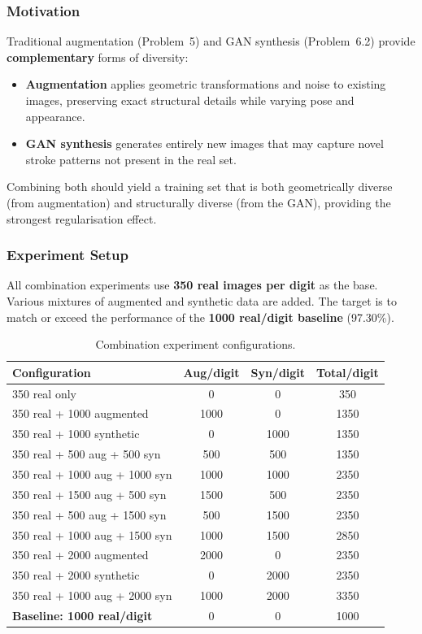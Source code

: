 \documentclass[12pt, a4paper]{article}
\renewcommand{\arraystretch}{1.12}
\begin{document}
\subsubsection{Motivation}

Traditional augmentation (Problem~5) and GAN synthesis (Problem~6.2) provide
\textbf{complementary} forms of diversity:
\begin{itemize}
    \item \textbf{Augmentation} applies geometric transformations and noise to existing
          images, preserving exact structural details while varying pose and appearance.
    \item \textbf{GAN synthesis} generates entirely new images that may capture novel
          stroke patterns not present in the real set.
\end{itemize}

Combining both should yield a training set that is both geometrically diverse (from
augmentation) and structurally diverse (from the GAN), providing the strongest
regularisation effect.

\subsubsection{Experiment Setup}

All combination experiments use \textbf{350 real images per digit} as the base. Various
mixtures of augmented and synthetic data are added. The target is to match or exceed
the performance of the \textbf{1000 real/digit baseline} (97.30\%).

\begin{table}[H]
\centering
\renewcommand{\arraystretch}{1.3}
\begin{tabular}{l c c c}
\toprule
\textbf{Configuration} & \textbf{Aug/digit} & \textbf{Syn/digit} & \textbf{Total/digit} \\
\midrule
350 real only                    & 0    & 0    & 350 \\
350 real + 1000 augmented        & 1000 & 0    & 1350 \\
350 real + 1000 synthetic        & 0    & 1000 & 1350 \\
350 real + 500 aug + 500 syn     & 500  & 500  & 1350 \\
350 real + 1000 aug + 1000 syn   & 1000 & 1000 & 2350 \\
350 real + 1500 aug + 500 syn    & 1500 & 500  & 2350 \\
350 real + 500 aug + 1500 syn    & 500  & 1500 & 2350 \\
350 real + 1000 aug + 1500 syn   & 1000 & 1500 & 2850 \\
350 real + 2000 augmented        & 2000 & 0    & 2350 \\
350 real + 2000 synthetic        & 0    & 2000 & 2350 \\
350 real + 1000 aug + 2000 syn   & 1000 & 2000 & 3350 \\
\midrule
\textbf{Baseline: 1000 real/digit} & 0 & 0 & 1000 \\
\bottomrule
\end{tabular}
\caption{Combination experiment configurations.}
\label{tab:prob6_combos}
\end{table}
\end{document}
